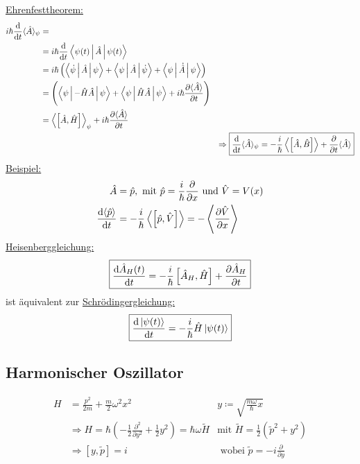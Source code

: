 	\underline{Ehrenfesttheorem:}
		\begin{align}\nonumber
			i \hbar \frac{\mathrm{d}}{\mathrm{d} t} \langle \hat{A} \rangle_\psi &= \\ \nonumber
			&= i \hbar \frac{\mathrm{d}}{\mathrm{d} t} \Braket{\psi(t) | \hat{A} | \psi(t)} \\ \nonumber
			&= i \hbar \left( \Braket{\dot{\psi} | \hat{A} | \psi} + \Braket{\psi | \hat{A} | \dot{\psi}} + \Braket{\psi | \dot{\hat{A}} | \psi} \right) \\ \nonumber
			&= \left( \Braket{\psi | - \hat{H} \hat{A} | \psi} + \Braket{\psi | \hat{H} \hat{A} | \psi} + i\hbar \frac{\partial \langle {\hat{A}} \rangle}{\partial t} 
			\right) \\ \nonumber
			&= \left\langle {\left[\hat{A} , \hat{H} \right]} \right\rangle_\psi + i\hbar \frac{\partial \langle {\hat{A}} \rangle}{\partial t} & \\ \nonumber
			&~ &\Rightarrow \text{\fbox{$\frac{\mathrm{d}}{\mathrm{d} t} \langle {\hat{A}} \rangle_\psi = -\frac{i}{\hbar} \left\langle {\left[ \hat{A} , \hat{B} \right]} \right\rangle + \frac{\partial}{\partial t} \langle {\hat{A}} \rangle$}} \\
		\end{align}
	\underline{Beispiel:}
		\begin{align*}
			\hat{A} &= \hat{p} , \text{~mit~} \hat{p} = \frac{i}{\hbar} \frac{\partial}{\partial x} \text{~und~}
			\hat{V} = V(x) \\
			\frac{\mathrm{d} \langle {\hat{p}} \rangle}{\mathrm{d} t} &=
			- \frac{i}{\hbar} \left\langle {\left[ \hat{p}, \hat{V}\right]} \right\rangle = - \left\langle {\frac{\partial \hat{V}}{\partial x}} \right\rangle 
		\end{align*}
	\underline{Heisenberggleichung:}
		\begin{align}
			\text{\fbox{$ \frac{\mathrm{d} \hat{A}_H(t)}{\mathrm{d} t}
					= - \frac{i}{\hbar} \left[ \hat{A}_H , \hat{H}\right]
					+ \frac{\partial \hat{A}_H}{\partial t}	$}}
		\end{align}
	ist äquivalent zur \underline{Schrödingergleichung:}
		\begin{equation}
			\text{\fbox{$ \frac{\mathrm{d} \ket{\psi(t)}}{\mathrm{d} t} =
					- \frac{i}{\hbar} \hat{H} \ket{\psi(t)}
					$}}
		\end{equation}
	\subsection{Harmonischer Oszillator}
		\begin{align*}
			H &= \frac{p^2}{2m} + \frac{m}{2} \omega^2 x^2 &y\coloneqq \sqrt{\frac{m \omega}{\hbar} x} \\
			&\Rightarrow H 
			= \hbar \left(- \frac{1}{2} \frac{\partial^2}{\partial y^2} 
			+ \frac{1}{2} y^2\right)
			= \hbar \omega \tilde{H} 
			&\text{mit~} \tilde{H} = \frac{1}{2} \left(\tilde{p}^2 + y^2\right)\\
			&\Rightarrow \left[ y, \tilde{p}\right] = i 
			&\text{~wobei~} \tilde{p} =-i \frac{\partial}{\partial y} \\
		\end{align*} %

